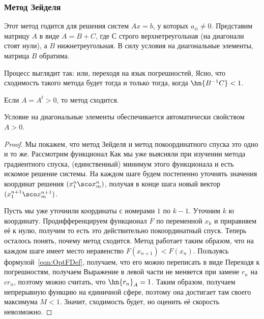 \documentclass[a4paper]{article}
\begin{document}
\subsubsection{Метод Зейделя}

Этот метод годится для решения систем $Ax = b$, у которых $a_{ii} \ne
0$.  Представим матрицу $A$ в виде $A = B + C$, где $С$ строго
верхнетреугольная (на диагонали стоят нули), а $B$ нижнетреугольная. В
силу условия на диагональные элементы, матрица $B$ обратима.

Процесс выглядит так:  или, переходя на
язык погрешностей,   Ясно, что
сходимость такого метода будет тогда и только тогда, когда
$\hn{B^{-1}C} < 1$.

\begin{theorem}
Если $A = A^t > 0$, то метод сходится.
\end{theorem}

\begin{note}
Условие на диагональные элементы обеспечивается автоматически
свойством $A > 0$.
\end{note}

\begin{proof}
Мы покажем, что метод Зейделя и метод покоординатного спуска это одно
и то же.  Рассмотрим функционал   Как мы
уже выясняли при изучении метода градиентного спуска, (единственный)
минимум этого функционала и есть искомое решение системы. На каждом
шаге будем постепенно уточнять значения координат решения $(x_1^n\sco
x_m^n)$, получая в конце шага новый вектор $(x_1^{n+1}\sco
x_m^{n+1})$.

Пусть мы уже уточнили координаты с номерами $1$ по $k-1$. Уточним $k$
ю координату.  Продифференцируем функционал $F$ по переменной $x_k$ и
приравняем её к нулю, получим  то есть это действительно покоординатный спуск.  Теперь
осталось понять, почему метод сходится.  Метод работает таким образом,
что на каждом шаге имеет место неравенство $F(x_{n+1}) <
F(x_n)$. Пользуясь формулой~\eqref{eqn:OptFDef}, получаем, что его
можно переписать в виде   Переходя к погрешностям, получаем
  Выражение в левой
части не меняется при замене $r_n$ на $c r_n$, поэтому можно считать,
что $\hn{r_n}_A = 1$. Таким образом, получаем непрерывную функцию на
единичной сфере, поэтому она достигает там своего максимума $M <
1$. Значит, сходимость будет, но оценить её скорость невозможно.
\end{proof}
\end{document}
